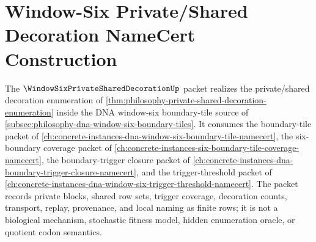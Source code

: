 \chapter{Window-Six Private/Shared Decoration NameCert Construction}
\label{ch:concrete-instances-window-six-private-shared-decoration-namecert}

The $\WindowSixPrivateSharedDecorationUp$ packet realizes the private/shared decoration enumeration of \autoref{thm:philosophy-private-shared-decoration-enumeration} inside the DNA window-six boundary-tile source of \autoref{subsec:philosophy-dna-window-six-boundary-tiles}. It consumes the boundary-tile packet of \autoref{ch:concrete-instances-dna-window-six-boundary-tile-namecert}, the six-boundary coverage packet of \autoref{ch:concrete-instances-six-boundary-tile-coverage-namecert}, the boundary-trigger closure packet of \autoref{ch:concrete-instances-dna-boundary-trigger-closure-namecert}, and the trigger-threshold packet of \autoref{ch:concrete-instances-dna-window-six-trigger-threshold-namecert}. The packet records private blocks, shared row sets, trigger coverage, decoration counts, transport, replay, provenance, and local naming as finite rows; it is not a biological mechanism, stochastic fitness model, hidden enumeration oracle, or quotient codon semantics.

